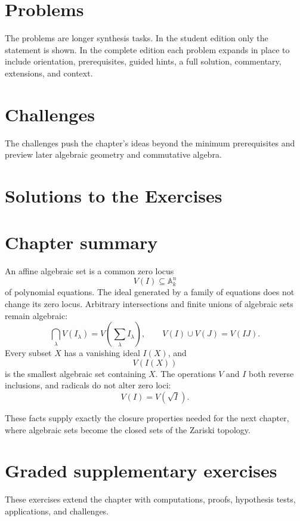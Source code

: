 \section{Problems}
\label{sec:vi01-problems}
The problems are longer synthesis tasks.  In the student edition only the statement is
shown.  In the complete edition each problem expands in place to include orientation,
prerequisites, guided hints, a full solution, commentary, extensions, and context.


\section{Challenges}
\label{sec:vi01-challenges}
The challenges push the chapter's ideas beyond the minimum prerequisites and preview later
algebraic geometry and commutative algebra.


\ifdefined\IncludeExerciseSolutions
\section{Solutions to the Exercises}
\label{sec:vi01-exercise-solutions}

\fi

\section{Chapter summary}
\label{sec:vi01-summary}

An affine algebraic set is a common zero locus
\[
  V(I)\subseteq\mathbb A_k^n
\]
of polynomial equations.  The ideal generated by a family of equations does not change its
zero locus.  Arbitrary intersections and finite unions of algebraic sets remain algebraic:
\[
  \bigcap_\lambda V(I_\lambda)
  =
  V\!\left(\sum_\lambda I_\lambda\right),
  \qquad
  V(I)\cup V(J)=V(IJ).
\]
Every subset \(X\) has a vanishing ideal \(I(X)\), and
\[
  V(I(X))
\]
is the smallest algebraic set containing \(X\).  The operations \(V\) and \(I\) both reverse
inclusions, and radicals do not alter zero loci:
\[
  V(I)=V(\sqrt I).
\]

These facts supply exactly the closure properties needed for the next chapter, where
algebraic sets become the closed sets of the Zariski topology.
\section{Graded supplementary exercises}
These exercises extend the chapter with computations, proofs, hypothesis tests, applications, and challenges.

